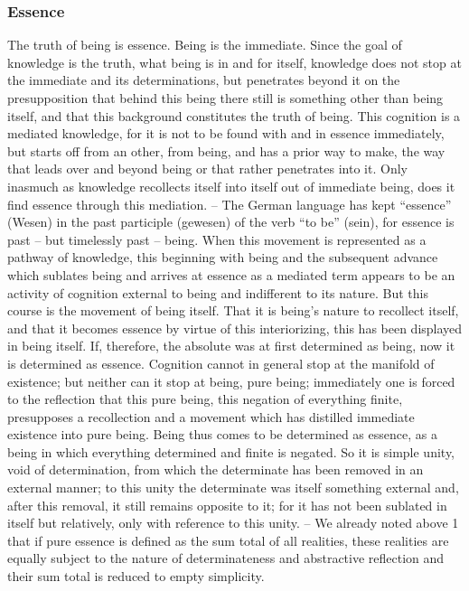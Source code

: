 \documentclass{article}
\begin{document}
\subsubsection{Essence}

The truth of being is essence.
Being is the immediate. Since the goal of knowledge is the truth, what
being is in and for itself, knowledge does not stop at the immediate and
its determinations, but penetrates beyond it on the presupposition that
behind this being there still is something other than being itself, and that
this background constitutes the truth of being. This cognition is a mediated
knowledge, for it is not to be found with and in essence immediately, but
starts off from an other, from being, and has a prior way to make, the way
that leads over and beyond being or that rather penetrates into it. Only
inasmuch as knowledge recollects itself into itself out of immediate being,
does it find essence through this mediation. – The German language has
kept “essence” (Wesen) in the past participle (gewesen) of the verb “to be”
(sein), for essence is past – but timelessly past – being.
When this movement is represented as a pathway of knowledge, this
beginning with being and the subsequent advance which sublates being
and arrives at essence as a mediated term appears to be an activity of
cognition external to being and indifferent to its nature.
But this course is the movement of being itself. That it is being’s nature
to recollect itself, and that it becomes essence by virtue of this interiorizing,
this has been displayed in being itself.
If, therefore, the absolute was at first determined as being, now it is
determined as essence. Cognition cannot in general stop at the manifold of
existence; but neither can it stop at being, pure being; immediately one is
forced to the reflection that this pure being, this negation of everything finite,
presupposes a recollection and a movement which has distilled immediate
existence into pure being. Being thus comes to be determined as essence, as
a being in which everything determined and finite is negated. So it is simple
unity, void of determination, from which the determinate has been removed
in an external manner; to this unity the determinate was itself something
external and, after this removal, it still remains opposite to it; for it has not
been sublated in itself but relatively, only with reference to this unity. – We
already noted above 1 that if pure essence is defined as the sum total of all
realities, these realities are equally subject to the nature of determinateness
and abstractive reflection and their sum total is reduced to empty simplicity.
\end{document}
